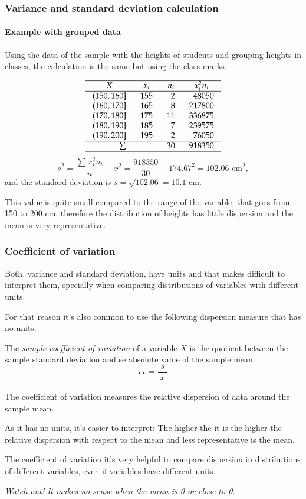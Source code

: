 \begin{frame}
\frametitle{Variance and standard deviation calculation}
\framesubtitle{Example with grouped data}
Using the data of the sample with the heights of students and grouping heights in classes, the calculation is the same
but using the class marks. 

\[
\setlength\arraycolsep{3mm}
\setlength\arrayrulewidth{0.5pt}
\begin{array}{rrrr}
\hline
\multicolumn{1}{c}{X} & \multicolumn{1}{c}{x_i} & \multicolumn{1}{c}{n_i} & \multicolumn{1}{c}{x_i^2n_i} \\
\hline
(150,160] & 155 & 2 & 48050\\
(160,170] & 165 & 8 & 217800\\
(170,180] & 175 & 11 & 336875\\
(180,190] & 185 & 7 & 239575\\
(190,200] & 195 & 2 & 76050\\
\hline
\sum &  & 30 & 918350 \\
\hline
\end{array}
\]
\[
s^2 = \frac{\sum x_i^2n_i}{n}-\bar x^2 = \frac{918350}{30}-174.67^2= 102.06 \mbox{ cm}^2,
\]
and the standard deviation is $s=\sqrt{102.06} = 10.1$ cm.

This value is quite small compared to the range of the variable, that goes from 150 to 200 cm, therefore the
distribution of heights has little dispersion and the mean is very representative.
\end{frame}


\begin{frame}
\frametitle{Coefficient of variation}
Both, variance and standard deviation, have units and that makes difficult to interpret them, specially when comparing
distributions of variables with different units.

For that reason it's also common to use the following dispersion measure that has no units.  
\begin{definition}
The \emph{sample coefficient of variation} of a variable $X$ is the quotient between the sample standard deviation and se
absolute value of the sample mean.
\[
cv = \frac{s}{|\bar x|}
\]
\end{definition}
The coefficient of variation measures the relative dispersion of data around the sample mean.  

As it has no units, it's easier to interpret: The higher the it is the higher the relative dispersion with respect to
the mean and less representative is the mean.

The coefficient of variation it's very helpful to compare dispersion in distributions of different variables, even if
variables have different units.
\begin{center}
\alert{\emph{Watch out! It makes no sense when the mean is 0 or close to 0.}}
\end{center}
\end{frame}



